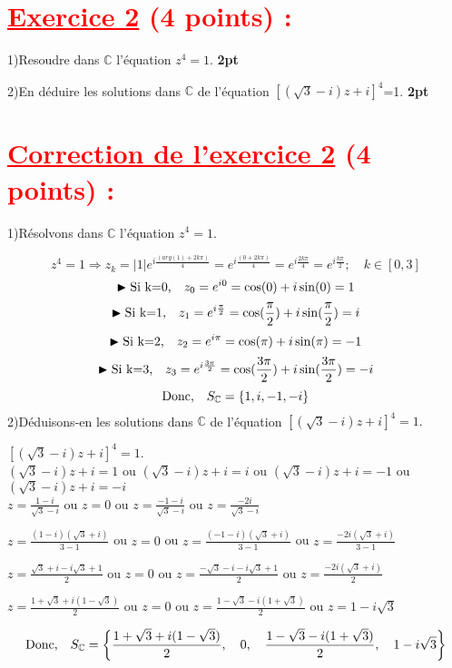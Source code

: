 \documentclass[12pt]{article}
\begin{document}
\section*{\textcolor{red}{\underline{Exercice 2} (4 points) :}}
1)Resoudre dans $\mathbb{C}$ l'équation $z^{4}=1$. \textbf{2pt}

2)En déduire les solutions dans $\mathbb{C}$ de l'équation $\left[\left(\sqrt{3}-i\right)z+i  \right]^{4}$=1. \textbf{2pt}
\section*{\textcolor{red}{\underline{Correction de l'exercice 2} (4 points) :}}
1)Résolvons dans $\mathbb{C}$ l'équation $z^{4}=1$.

\[z^{4}=1\Rightarrow z_{k}=|1|e^{i\frac{(arg(1)+2k\pi)}{4}}=e^{i\frac{(0+2k\pi)}{4}}=e^{i\frac{2k\pi}{4}}=e^{i\frac{k\pi}{2}};\quad k\in \left[0,3\right]  \]
\[\blacktriangleright\text{Si k=0,\quad }z_{0}=e^{i0}=\cos(0)+i\sin(0)=1\]
\[\blacktriangleright\text{Si k=1,\quad }z_{1}=e^{i\frac{\pi}{2}}=\cos(\frac{\pi}{2})+i\sin(\frac{\pi}{2})=i\]
\[\blacktriangleright\text{Si k=2,\quad }z_{2}=e^{i\pi}=\cos(\pi)+i\sin(\pi)=-1\]
\[\blacktriangleright\text{Si k=3,\quad }z_{3}=e^{i\frac{3\pi}{2}}=\cos(\frac{3\pi}{2})+i\sin(\frac{3\pi}{2})=-i\]
\[\text{Donc,\quad} S_{\mathbb{C}}=\left\lbrace 1, i, -1, -i \right\rbrace \]
2)Déduisons-en les solutions dans $\mathbb{C}$ de l'équation $\left[\left(\sqrt{3}-i\right)z+i  \right]^{4}=1.$

$\left[\left(\sqrt{3}-i\right)z+i  \right]^{4}=1.$\\
$\left(\sqrt{3}-i\right)z+i=1$ ou $\left(\sqrt{3}-i\right)z+i=i$ ou $\left(\sqrt{3}-i\right)z+i=-1$ ou $\left(\sqrt{3}-i\right)z+i=-i$\\
$z=\frac{1-i}{\sqrt{3}-i}$ ou $z=0$ ou $z=\frac{-1-i}{\sqrt{3}-i}$ ou $z=\frac{-2i}{\sqrt{3}-i}$

$z=\frac{(1-i)(\sqrt{3}+i)}{3-1}$ ou $z=0$ ou $z=\frac{(-1-i)(\sqrt{3}+i)}{3-1}$ ou $z=\frac{-2i(\sqrt{3}+i)}{3-1}$

$z=\frac{\sqrt{3}+i-i\sqrt{3}+1}{2}$ ou $z=0$ ou $z=\frac{-\sqrt{3}-i-i\sqrt{3}+1}{2}$ ou $z=\frac{-2i(\sqrt{3}+i)}{2}$

$z=\frac{1+\sqrt{3}+i(1-\sqrt{3})}{2}$ ou $z=0$ ou $z=\frac{1-\sqrt{3}-i(1+\sqrt{3})}{2}$ ou $z=1-i\sqrt{3}$

\[\text{Donc,\quad} S_{\mathbb{C}}=\left\lbrace \frac{1+\sqrt{3}+i(1-\sqrt{3})}{2},\quad 0,\quad \frac{1-\sqrt{3}-i(1+\sqrt{3})}{2},\quad 1-i\sqrt{3} \right\rbrace \]
\end{document}
